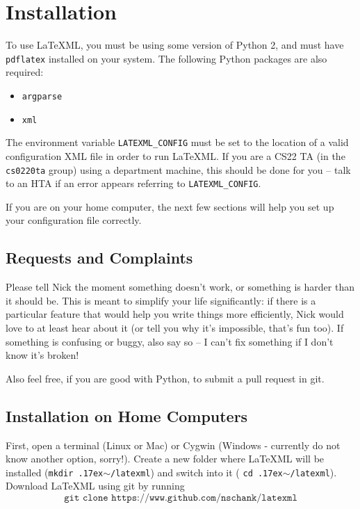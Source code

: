 \section{Installation}
  To use \LaTeX ML, you must be using some version of Python 2, and must have 
  \texttt{pdflatex} installed on your system. The following Python packages are 
  also required:
  
  \begin{itemize}\itemsep0pt
    \item \texttt{argparse}
    \item \texttt{xml}
  \end{itemize}
  
  The environment variable \texttt{LATEXML\_CONFIG} must be set to the location 
  of a valid configuration XML file in order to run \LaTeX ML. If you are a CS22
  TA (in the \texttt{cs0220ta} group) using a department machine, this should be
  done for you -- talk to an HTA if an error appears referring to 
  \texttt{LATEXML\_CONFIG}.
  
  If you are on your home computer, the next few sections will help you set up 
  your configuration file correctly.
  
  \subsection{Requests and Complaints}
    Please tell Nick the moment something doesn't work, or something is harder
    than it should be. This is meant to simplify your life significantly: if
    there is a particular feature that would help you write things more 
    efficiently, Nick would love to at least hear about it (or tell you 
    why it's impossible, that's fun too). If something is confusing or 
    buggy, also say so -- I can't fix something if I don't know it's broken!
    
    Also feel free, if you are good with Python, to submit a pull request 
    in git.
    
  \subsection{Installation on Home Computers}  
    \newcommand\mytilde{\raise.17ex\hbox{$\scriptstyle\sim$}}
    \newcommand\ttquote{\texttt{\char`\"}}
  
    First, open a terminal (Linux or Mac) or Cygwin (Windows - currently do not
    know another option, sorry!). Create a new folder where \LaTeX ML will 
    be installed (\texttt{mkdir \mytilde/latexml}) and switch into it (
    \texttt{cd \mytilde/latexml}). Download \LaTeX ML using git by running 
    \[\texttt{git clone https://www.github.com/nschank/latexml}\]
    
